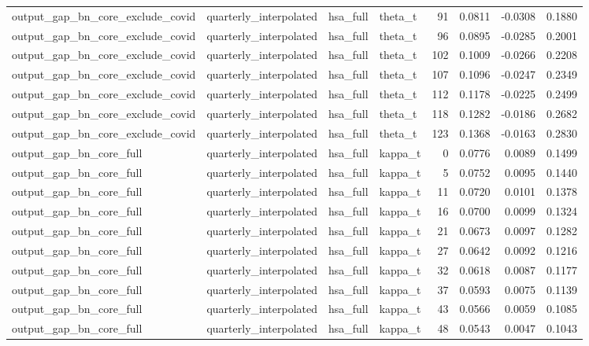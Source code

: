 \begin{tabular}{llllrrrr}
output\_gap\_bn\_core\_exclude\_covid & quarterly\_interpolated & hsa\_full & theta\_t & 91 & 0.0811 & -0.0308 & 0.1880 \\
output\_gap\_bn\_core\_exclude\_covid & quarterly\_interpolated & hsa\_full & theta\_t & 96 & 0.0895 & -0.0285 & 0.2001 \\
output\_gap\_bn\_core\_exclude\_covid & quarterly\_interpolated & hsa\_full & theta\_t & 102 & 0.1009 & -0.0266 & 0.2208 \\
output\_gap\_bn\_core\_exclude\_covid & quarterly\_interpolated & hsa\_full & theta\_t & 107 & 0.1096 & -0.0247 & 0.2349 \\
output\_gap\_bn\_core\_exclude\_covid & quarterly\_interpolated & hsa\_full & theta\_t & 112 & 0.1178 & -0.0225 & 0.2499 \\
output\_gap\_bn\_core\_exclude\_covid & quarterly\_interpolated & hsa\_full & theta\_t & 118 & 0.1282 & -0.0186 & 0.2682 \\
output\_gap\_bn\_core\_exclude\_covid & quarterly\_interpolated & hsa\_full & theta\_t & 123 & 0.1368 & -0.0163 & 0.2830 \\
output\_gap\_bn\_core\_full & quarterly\_interpolated & hsa\_full & kappa\_t & 0 & 0.0776 & 0.0089 & 0.1499 \\
output\_gap\_bn\_core\_full & quarterly\_interpolated & hsa\_full & kappa\_t & 5 & 0.0752 & 0.0095 & 0.1440 \\
output\_gap\_bn\_core\_full & quarterly\_interpolated & hsa\_full & kappa\_t & 11 & 0.0720 & 0.0101 & 0.1378 \\
output\_gap\_bn\_core\_full & quarterly\_interpolated & hsa\_full & kappa\_t & 16 & 0.0700 & 0.0099 & 0.1324 \\
output\_gap\_bn\_core\_full & quarterly\_interpolated & hsa\_full & kappa\_t & 21 & 0.0673 & 0.0097 & 0.1282 \\
output\_gap\_bn\_core\_full & quarterly\_interpolated & hsa\_full & kappa\_t & 27 & 0.0642 & 0.0092 & 0.1216 \\
output\_gap\_bn\_core\_full & quarterly\_interpolated & hsa\_full & kappa\_t & 32 & 0.0618 & 0.0087 & 0.1177 \\
output\_gap\_bn\_core\_full & quarterly\_interpolated & hsa\_full & kappa\_t & 37 & 0.0593 & 0.0075 & 0.1139 \\
output\_gap\_bn\_core\_full & quarterly\_interpolated & hsa\_full & kappa\_t & 43 & 0.0566 & 0.0059 & 0.1085 \\
output\_gap\_bn\_core\_full & quarterly\_interpolated & hsa\_full & kappa\_t & 48 & 0.0543 & 0.0047 & 0.1043 \\

\end{tabular}
